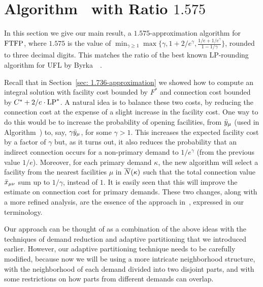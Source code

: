

\section{Algorithm~{\EBGS} with Ratio $1.575$}\label{sec: 1.575-approximation}

In this section we give our main result, a $1.575$-approximation
algorithm for $\mbox{\rm FTFP}$, where $1.575$ is the value of $\min_{\gamma\geq
  1}\max\{\gamma, 1+2/e^\gamma, \frac{1/e+1/e^\gamma}{1-1/\gamma}\}$,
rounded to three decimal digits. This matches the ratio of the best
known LP-rounding algorithm for UFL by
Byrka~{\etal}~\cite{ByrkaGS10}. 

Recall that in Section~\ref{sec: 1.736-approximation} we showed how to
compute an integral solution with facility cost bounded by $F^\ast$
and connection cost bounded by $C^\ast + 2/e\cdot\mbox{\rm LP}^\ast$. A natural
idea is to balance these two costs, by reducing the connection cost at
the expense of a slight increase in the facility cost. One way to do
this would be to increase the probability of opening facilities, from
${\bar y}_{\mu}$ (used in Algorithm~{\ECHS}) to, say,
$\gamma{\bar y}_{\mu}$, for some $\gamma > 1$. This increases the
expected facility cost by a factor of $\gamma$ but, as it turns out,
it also reduces the probability that an indirect connection occurs for
a non-primary demand to $1/e^\gamma$ (from the previous value
$1/e$). Moreover, for each primary demand $\kappa$, the new algorithm
will select a facility from the nearest facilities $\mu$ in
${\overline{N}}(\kappa)$ such that the total connection value ${\bar x}_{\mu\nu}$
sum up to $1/\gamma$, instead of $1$. It is easily seen that this will
improve the estimate on connection cost for primary demands.  These
two changes, along with a more refined analysis, are the essence of
the approach in~\cite{ByrkaGS10}, expressed in our terminology.

Our approach can be thought of as a combination of the above ideas
with the techniques of demand reduction and
adaptive partitioning that we introduced earlier. However, our
adaptive partitioning technique needs to be carefully modified,
because now we will be using a more intricate neighborhood structure,
with the neighborhood of each demand divided into two disjoint parts,
and with some restrictions on how parts from different demands can overlap.

